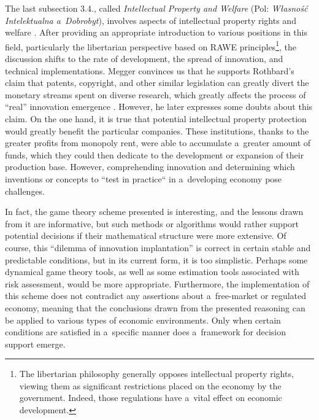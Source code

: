The last subsection 3.4., called \textit{Intellectual Property and Welfare} (Pol: \textit{Własność Intelektualna a~Dobrobyt}), involves aspects of intellectual property rights and welfare 
\parencite[][pp.94–101]{megger_sprawiedliwosc_2021}. %
 After providing an appropriate introduction to various positions in this field, particularly the libertarian perspective based on RAWE principles\footnote{The libertarian philosophy generally opposes intellectual property rights, viewing them as significant restrictions placed on the economy by the government. Indeed, those regulations have a~vital effect on economic development.}, the discussion shifts to the rate of development, the spread of innovation, and technical implementations. Megger convinces us that he supports Rothbard's claim that patents, copyright, and other similar legislation can greatly divert the monetary streams spent on diverse research, which greatly affects the process of ``real'' innovation emergence 
\parencite[][p.97]{megger_sprawiedliwosc_2021}. %
 However, he later expresses some doubts about this claim. On the one hand, it is true that potential intellectual property protection would greatly benefit the particular companies. These institutions, thanks to the greater profits from monopoly rent, were able to accumulate a~greater amount of funds, which they could then dedicate to the development or expansion of their production base. However, comprehending innovation and determining which inventions or concepts to ``test in practice`` in a~developing economy pose challenges.



In fact, the game theory scheme presented 
\parencite[][p.98]{megger_sprawiedliwosc_2021} %
 is interesting, and the lessons drawn from it are informative, but such methods or algorithms would rather support potential decisions if their mathematical structure were more extensive. Of course, this ``dilemma of innovation implantation'' is correct in certain stable and predictable conditions, but in its current form, it is too simplistic. Perhaps some dynamical game theory tools, as well as some estimation tools associated with risk assessment, would be more appropriate. Furthermore, the implementation of this scheme does not contradict any assertions about a~free-market or regulated economy, meaning that the conclusions drawn from the presented reasoning can be applied to various types of economic environments. Only when certain conditions are satisfied in a~specific manner does a~framework for decision support emerge.



